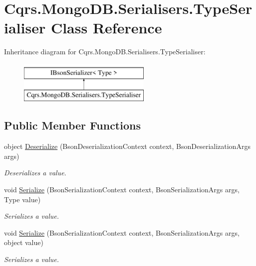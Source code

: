 \hypertarget{classCqrs_1_1MongoDB_1_1Serialisers_1_1TypeSerialiser}{}\section{Cqrs.\+Mongo\+D\+B.\+Serialisers.\+Type\+Serialiser Class Reference}
\label{classCqrs_1_1MongoDB_1_1Serialisers_1_1TypeSerialiser}
Inheritance diagram for Cqrs.\+Mongo\+D\+B.\+Serialisers.\+Type\+Serialiser\+:\begin{figure}[H]
\begin{center}
\leavevmode
\includegraphics[height=2.000000cm]{classCqrs_1_1MongoDB_1_1Serialisers_1_1TypeSerialiser}
\end{center}
\end{figure}
\subsection*{Public Member Functions}
\begin{DoxyCompactItemize}
\item 
object \hyperlink{classCqrs_1_1MongoDB_1_1Serialisers_1_1TypeSerialiser_a5e8aa7ae1372033da215d02b79947b20_a5e8aa7ae1372033da215d02b79947b20}{Deserialize} (Bson\+Deserialization\+Context context, Bson\+Deserialization\+Args args)
\begin{DoxyCompactList}\small\item\em Deserializes a value. \end{DoxyCompactList}\item 
void \hyperlink{classCqrs_1_1MongoDB_1_1Serialisers_1_1TypeSerialiser_a4aec60f5df74f482b576f4e0dad0d5f6_a4aec60f5df74f482b576f4e0dad0d5f6}{Serialize} (Bson\+Serialization\+Context context, Bson\+Serialization\+Args args, Type value)
\begin{DoxyCompactList}\small\item\em Serializes a value. \end{DoxyCompactList}\item 
void \hyperlink{classCqrs_1_1MongoDB_1_1Serialisers_1_1TypeSerialiser_a2362ae784859054bf5b9281dafeb37cd_a2362ae784859054bf5b9281dafeb37cd}{Serialize} (Bson\+Serialization\+Context context, Bson\+Serialization\+Args args, object value)
\begin{DoxyCompactList}\small\item\em Serializes a value. \end{DoxyCompactList}\end{DoxyCompactItemize}
